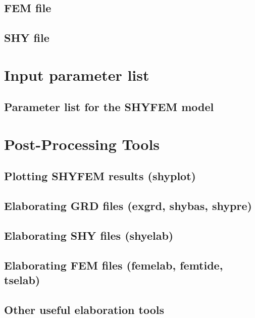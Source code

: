 \documentclass{report}
\begin{document}
	\section{FEM file}
	

	\section{SHY file}
	



\chapter{Input parameter list}
      \section{Parameter list for the SHYFEM model}
        \label{param_list}
	

\chapter{Post-Processing Tools}
	\section{Plotting SHYFEM results (shyplot)}
	

      \section{Elaborating GRD files (exgrd, shybas, shypre)}
      \label{elab_grd}

	\section{Elaborating SHY files (shyelab)}


	\section{Elaborating FEM files (femelab, femtide, tselab)}
	


	\section{Other useful elaboration tools}
	\label{postproc_prg}
      
\end{document}
